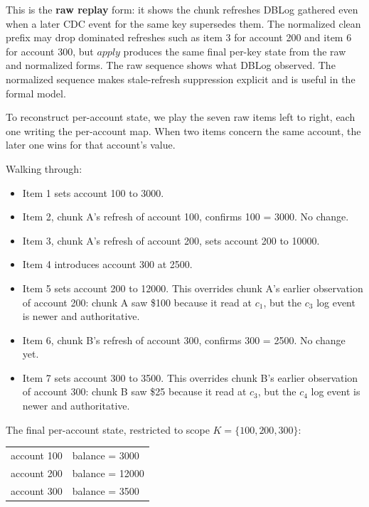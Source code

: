 \documentclass[letterpaper,10pt,twocolumn]{article}
\newcommand{\Apply}{\mathit{apply}}
\providecommand{\tightlist}{\setlength{\itemsep}{0pt}\setlength{\parskip}{0pt}}
\begin{document}
This is the \textbf{raw replay} form: it shows the chunk refreshes DBLog
gathered even when a later CDC event for the same key supersedes them.
The normalized clean prefix may drop dominated refreshes such as item 3
for account 200 and item 6 for account 300, but $\Apply$ produces the same
final per-key state from the raw and normalized forms. The raw sequence
shows what DBLog observed. The normalized sequence makes stale-refresh
suppression explicit and is useful in the formal model.

To reconstruct per-account state, we play the seven raw items left to
right, each one writing the per-account map. When two items concern the
same account, the later one wins for that account's value.

Walking through:

\begin{itemize}
\tightlist
\item
  Item 1 sets account 100 to 3000.
\item
  Item 2, chunk A's refresh of account 100, confirms 100 = 3000. No
  change.
\item
  Item 3, chunk A's refresh of account 200, sets account 200 to 10000.
\item
  Item 4 introduces account 300 at 2500.
\item
  Item 5 sets account 200 to 12000. This overrides chunk A's earlier
  observation of account 200: chunk A saw \$100 because it read at
  $c_1$, but the $c_3$ log event is newer and
  authoritative.
\item
  Item 6, chunk B's refresh of account 300, confirms 300 = 2500. No
  change yet.
\item
  Item 7 sets account 300 to 3500. This overrides chunk B's earlier
  observation of account 300: chunk B saw \$25 because it read at
  $c_3$, but the $c_4$ log event is newer and
  authoritative.
\end{itemize}

The final per-account state, restricted to scope $K = \{100, 200, 300\}$:

\begin{center}\ttfamily\footnotesize
\begin{tabular}{@{}l@{\hskip 1em}l@{}}
account 100 & balance = \phantom{0}3000\\
account 200 & balance = 12000\\
account 300 & balance = \phantom{0}3500\\
\end{tabular}
\end{center}
\end{document}
